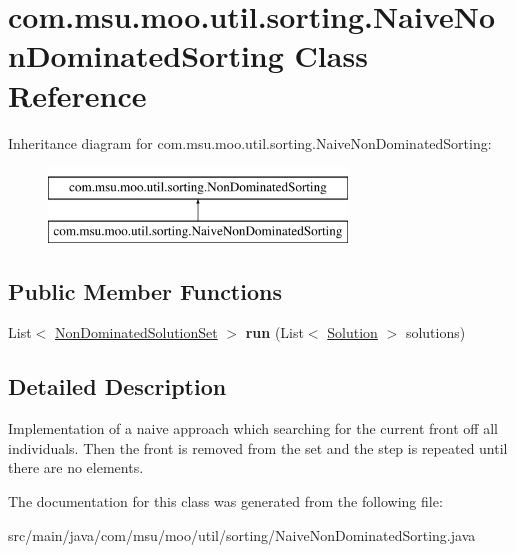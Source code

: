 \hypertarget{classcom_1_1msu_1_1moo_1_1util_1_1sorting_1_1NaiveNonDominatedSorting}{\section{com.\-msu.\-moo.\-util.\-sorting.\-Naive\-Non\-Dominated\-Sorting Class Reference}
\label{classcom_1_1msu_1_1moo_1_1util_1_1sorting_1_1NaiveNonDominatedSorting}
}
Inheritance diagram for com.\-msu.\-moo.\-util.\-sorting.\-Naive\-Non\-Dominated\-Sorting\-:\begin{figure}[H]
\begin{center}
\leavevmode
\includegraphics[height=2.000000cm]{classcom_1_1msu_1_1moo_1_1util_1_1sorting_1_1NaiveNonDominatedSorting}
\end{center}
\end{figure}
\subsection*{Public Member Functions}
\begin{DoxyCompactItemize}
\item 
\hypertarget{classcom_1_1msu_1_1moo_1_1util_1_1sorting_1_1NaiveNonDominatedSorting_a803cd43127e54f700b217ff02f1f396c}{List$<$ \hyperlink{classcom_1_1msu_1_1moo_1_1model_1_1solution_1_1NonDominatedSolutionSet}{Non\-Dominated\-Solution\-Set} $>$ {\bfseries run} (List$<$ \hyperlink{classcom_1_1msu_1_1moo_1_1model_1_1solution_1_1Solution}{Solution} $>$ solutions)}\label{classcom_1_1msu_1_1moo_1_1util_1_1sorting_1_1NaiveNonDominatedSorting_a803cd43127e54f700b217ff02f1f396c}

\end{DoxyCompactItemize}


\subsection{Detailed Description}
Implementation of a naive approach which searching for the current front off all individuals. Then the front is removed from the set and the step is repeated until there are no elements. 

The documentation for this class was generated from the following file\-:\begin{DoxyCompactItemize}
\item 
src/main/java/com/msu/moo/util/sorting/Naive\-Non\-Dominated\-Sorting.\-java\end{DoxyCompactItemize}
